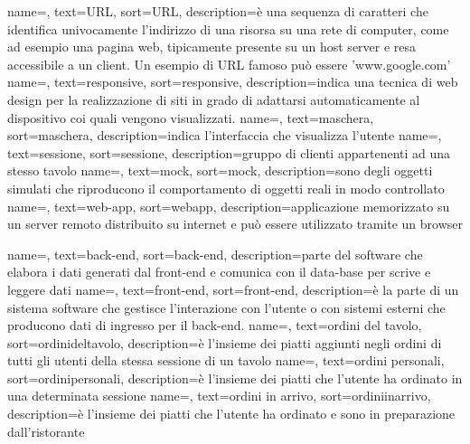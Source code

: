 {
    name=,
    text=URL,
    sort=URL,
    description={è una sequenza di caratteri che identifica univocamente l'indirizzo di una risorsa su una rete di computer, come ad esempio una pagina web, tipicamente presente su un host server e resa accessibile a un client. Un esempio di URL famoso può essere 'www.google.com'}
}
{
    name=,
    text=responsive,
    sort=responsive,
    description={indica una tecnica di web design per la realizzazione di siti in grado di adattarsi automaticamente al dispositivo coi quali vengono visualizzati.}
}
{
    name=,
    text=maschera,
    sort=maschera,
    description={indica l'interfaccia che visualizza l'utente}
}
{
    name=,
    text=sessione,
    sort=sessione,
    description={gruppo di clienti appartenenti ad una stesso tavolo}
}
{
    name=,
    text=mock,
    sort=mock,
    description={sono degli oggetti simulati che riproducono il comportamento di oggetti reali in modo controllato}
}
{
    name=,
    text=web-app,
    sort=webapp,
    description={applicazione memorizzato su un server remoto distribuito su internet e può essere utilizzato tramite un browser}
}

{
    name=,
    text=back-end,
    sort=back-end,
    description={parte del software che elabora i dati generati dal front-end e comunica con il data-base per scrive e leggere dati}
}
{
    name=,
    text=front-end,
    sort=front-end,
    description={è la parte di un sistema software che gestisce l'interazione con l'utente o con sistemi esterni che producono dati di ingresso per il back-end.}
}
{
    name=,
    text=ordini del tavolo,
    sort=ordinideltavolo,
    description={è l'insieme dei piatti aggiunti negli ordini di tutti gli utenti della stessa sessione di un tavolo}
}
{
    name=,
    text=ordini personali,
    sort=ordinipersonali,
    description={è l'insieme dei piatti che l'utente ha ordinato in una determinata sessione}
}
{
    name=,
    text=ordini in arrivo,
    sort=ordiniinarrivo,
    description={è l'insieme dei piatti che l'utente ha ordinato e sono in preparazione dall'ristorante}
}

